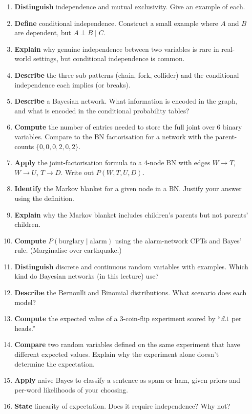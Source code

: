 \documentclass[11pt, a4paper]{article}
\begin{document}
\begin{enumerate}
  \item \textbf{Distinguish} independence and mutual exclusivity. Give an example of each.
  \item \textbf{Define} conditional independence. Construct a small example where $A$ and $B$ are dependent, but $A \perp B \mid C$.
  \item \textbf{Explain} why genuine independence between two variables is rare in real-world settings, but conditional independence is common.
  \item \textbf{Describe} the three sub-patterns (chain, fork, collider) and the conditional independence each implies (or breaks).
  \item \textbf{Describe} a Bayesian network. What information is encoded in the graph, and what is encoded in the conditional probability tables?
  \item \textbf{Compute} the number of entries needed to store the full joint over 6 binary variables. Compare to the BN factorisation for a network with the parent-counts $\{0, 0, 0, 2, 0, 2\}$.
  \item \textbf{Apply} the joint-factorisation formula to a 4-node BN with edges $W \to T$, $W \to U$, $T \to D$. Write out $P(W, T, U, D)$.
  \item \textbf{Identify} the Markov blanket for a given node in a BN. Justify your answer using the definition.
  \item \textbf{Explain} why the Markov blanket includes children's parents but not parents' children.
  \item \textbf{Compute} $P(\text{burglary} \mid \text{alarm})$ using the alarm-network CPTs and Bayes' rule. (Marginalise over earthquake.)
  \item \textbf{Distinguish} discrete and continuous random variables with examples. Which kind do Bayesian networks (in this lecture) use?
  \item \textbf{Describe} the Bernoulli and Binomial distributions. What scenario does each model?
  \item \textbf{Compute} the expected value of a 3-coin-flip experiment scored by ``$\pounds 1$ per heads.''
  \item \textbf{Compare} two random variables defined on the same experiment that have different expected values. Explain why the experiment alone doesn't determine the expectation.
  \item \textbf{Apply} naive Bayes to classify a sentence as spam or ham, given priors and per-word likelihoods of your choosing.
  \item \textbf{State} linearity of expectation. Does it require independence? Why not?
\end{enumerate}
\end{document}
